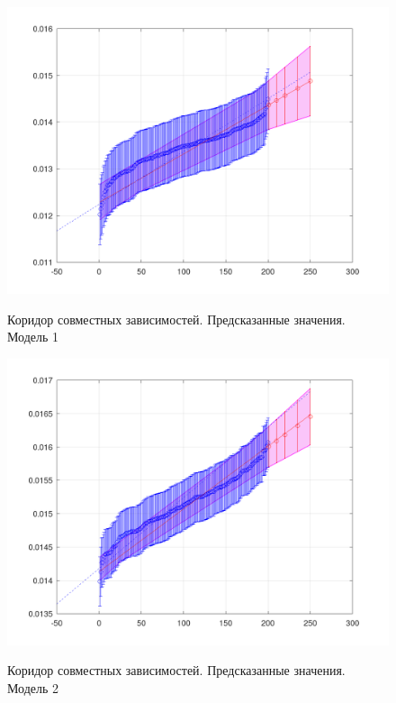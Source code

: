 \begin{figure}[H]
	\begin{center}
		\includegraphics[scale=0.32]{prediction_1}
		\label{pic:prediction1}
		\caption{Коридор совместных зависимостей. Предсказанные значения. Модель 1}
	\end{center}
\end{figure}

\begin{figure}[H]
	\begin{center}
		\includegraphics[scale=0.32]{prediction_2}
		\label{pic:prediction2}
		\caption{Коридор совместных зависимостей. Предсказанные значения. Модель 2}
	\end{center}
\end{figure}

